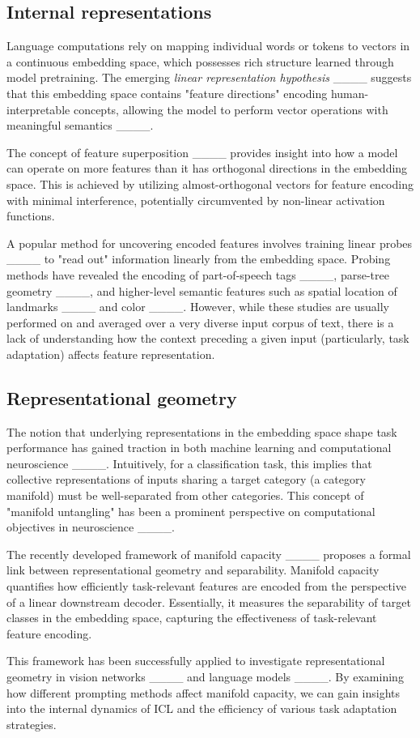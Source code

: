 \subsection{Internal representations}
Language computations rely on mapping individual words or tokens to vectors in a continuous embedding space, which possesses rich structure learned through model pretraining. The emerging \textit{linear representation hypothesis} ____ suggests that this embedding space contains "feature directions" encoding human-interpretable concepts, allowing the model to perform vector operations with meaningful semantics ____.

The concept of feature superposition ____ provides insight into how a model can operate on more features than it has orthogonal directions in the embedding space. This is achieved by utilizing almost-orthogonal vectors for feature encoding with minimal interference, potentially circumvented by non-linear activation functions.

A popular method for uncovering encoded features involves training linear probes ____ to "read out" information linearly from the embedding space. Probing methods have revealed the encoding of part-of-speech tags ____, parse-tree geometry ____, and higher-level semantic features such as spatial location of landmarks ____ and color ____. However, while these studies are usually performed on and averaged over a very diverse input corpus of text, there is a lack of understanding how the context preceding a given input (particularly, task adaptation) affects feature representation.

\subsection{Representational geometry}

The notion that underlying representations in the embedding space shape task performance has gained traction in both machine learning and computational neuroscience ____. Intuitively, for a classification task, this implies that collective representations of inputs sharing a target category (a category manifold) must be well-separated from other categories. This concept of "manifold untangling" has been a prominent perspective on computational objectives in neuroscience ____.

The recently developed framework of manifold capacity ____ proposes a formal link between representational geometry and separability. Manifold capacity quantifies how efficiently task-relevant features are encoded from the perspective of a linear downstream decoder. Essentially, it measures the separability of target classes in the embedding space, capturing the effectiveness of task-relevant feature encoding.

This framework has been successfully applied to investigate representational geometry in vision networks ____ and language models ____. By examining how different prompting methods affect manifold capacity, we can gain insights into the internal dynamics of ICL and the efficiency of various task adaptation strategies.
